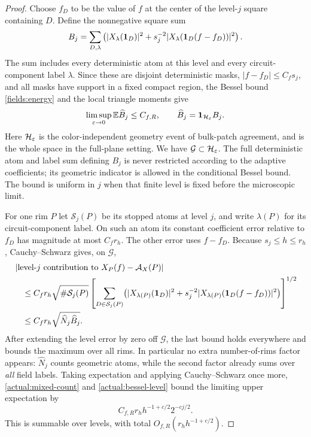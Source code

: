 \begin{proof}
Choose $f_D$ to be the value of $f$ at the center of the level-$j$
square containing $D$.  Define the nonnegative square sum
\begin{equation}\label{actual:bessel-level}
 B_j=\sum_{D,\lambda}\left(
       |X_\lambda(\mathbf 1_D)|^2+
       s_j^{-2}|X_\lambda(\mathbf 1_D(f-f_D))|^2\right).
\end{equation}
The sum includes every deterministic atom at this level and every
circuit-component label $\lambda$.  Since these are disjoint
deterministic masks, $|f-f_D|\le C_fs_j$, and all masks have support
in a fixed compact region, the Bessel bound
\eqref{fields:energy} and the local triangle moments give
\[
              \limsup_{\varepsilon\to0}\mathbb E\widehat B_j\le C_{f,R},
       \qquad \widehat B_j=\mathbf 1_{\mathcal H_\varepsilon}B_j.
\]
Here $\mathcal H_\varepsilon$ is the color-independent geometry event of
bulk-patch agreement, and is the whole space in the full-plane setting.
We have $\mathcal G\subset\mathcal H_\varepsilon$. The full deterministic
atom and label sum defining $B_j$ is never restricted according to
the adaptive coefficients; its geometric indicator is allowed in
the conditional Bessel bound.
The bound is uniform in $j$ when that finite level is fixed before
the microscopic limit.

For one rim $P$ let $\mathcal S_j(P)$ be its stopped atoms at
level $j$, and write $\lambda(P)$ for its circuit-component label.
On such an atom its constant coefficient error relative to $f_D$
has magnitude at most $C_fr_h$.  The other error uses $f-f_D$.
Because $s_j\le h\le r_h$, Cauchy--Schwarz gives, on $\mathcal G$,
\begin{align*}
 &\left|\text{level-}j\text{ contribution to }
                    X_P(f)-\mathcal A_X(P)\right|\\
 &\quad\le C_fr_h\sqrt{\#\mathcal S_j(P)}
 \left[\sum_{D\in\mathcal S_j(P)}
       \bigl(|X_{\lambda(P)}(\mathbf 1_D)|^2+
       s_j^{-2}|X_{\lambda(P)}(\mathbf 1_D(f-f_D))|^2\bigr)\right]^{1/2}\\
 &\quad\le C_fr_h\sqrt{\widehat N_j\widehat B_j}.
\end{align*}
After extending the level error by zero off $\mathcal G$, the last
bound holds everywhere and bounds the maximum over all rims. In particular
no extra number-of-rims factor appears: $\widehat N_j$ counts geometric
atoms, while the second factor already sums over \emph{all} field
labels.  Taking expectation and applying Cauchy--Schwarz once more,
\eqref{actual:mixed-count} and \eqref{actual:bessel-level} bound the
limiting upper expectation by
\[
              C_{f,R}r_hh^{-1+c/2}2^{-cj/2}.
\]
This is summable over levels, with total
$O_{f,R}(r_hh^{-1+c/2})$.


\end{proof}
